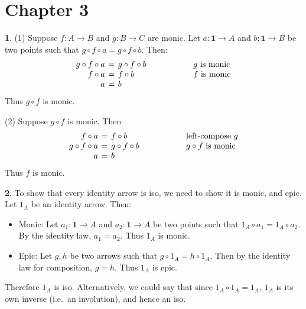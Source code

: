 \documentclass{article}
\theoremstyle{definition}
\newcommand{\point}[1]{\mathbf{1} \to #1}
\theoremstyle{definition}
\newtheorem{solution-internal}{}[subsection]
\newenvironment{solution}{
  \begin{solution-internal}
}{
  \end{solution-internal}
}
\begin{document}
\section*{Chapter 3}
\setcounter{section}{3}
\setcounter{subsection}{1}
\begin{solution}
  (1) Suppose $f\colon A \to B$ and $g\colon B \to C$ are monic. Let $a\colon
  \mathbf{1} \to A$ and $b\colon \mathbf{1} \to B$ be two points
  such that $g \circ f \circ a = g \circ f \circ b$. Then:
  \[
    \arraycolsep=2pt
    \begin{array}{rcl@{\hspace{2cm}}l}
      g \circ f \circ a &=& g \circ f \circ b & \text{$g$ is monic}\\
      f \circ a &=& f \circ b & \text{$f$ is monic}\\
      a &=& b & \\
  \end{array}
  \]
  Thus $g \circ f$ is monic.

  (2) Suppose $g \circ f$ is monic. Then
  \[
    \arraycolsep=2pt
    \begin{array}{rcl@{\hspace{2cm}}l}
      f \circ a &=& f \circ b & \text{left-compose $g$}\\
      g \circ f \circ a &=& g \circ f \circ b & \text{$g \circ f$ is monic}\\
      a &=& b & \\
  \end{array}
  \]
  Thus $f$ is monic.

\end{solution}


\setcounter{subsection}{3}
\setcounter{solution-internal}{0}
\begin{solution}
To show that every identity arrow is iso, we need to show it is monic,
and epic. Let $1_A$ be an identity arrow. Then:
\begin{itemize}
  \item Monic: Let $a_1 \colon \point{A}$ and $a_2 \colon \point{A}$ be two points
    such that $1_A \circ a_1 = 1_A \circ a_2$. By the identity law, $a_1 =
    a_2$. Thus $1_A$ is monic.
  \item Epic: Let $g, h$ be two arrows such that $g \circ 1_A = h \circ 1_A$.
    Then by the identity law for composition, $g = h$. Thus $1_A$ is epic.
\end{itemize}
Therefore $1_A$ is iso. Alternatively, we could say that since $1_A \circ 1_A
= 1_A$, $1_A$ is its own inverse (i.e.\ an involution), and hence an iso.
\end{solution}
\end{document}
